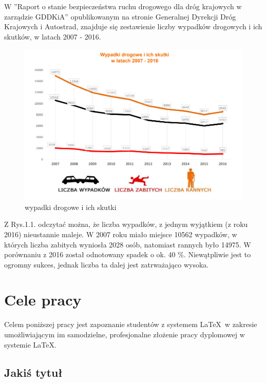 \newpage


W ''Raport o stanie bezpieczeństwa ruchu drogowego dla dróg krajowych w zarządzie GDDKiA'' opublikowanym na stronie Generalnej Dyrekcji Dróg Krajowych i Autostrad, znajduje się zestawienie liczby wypadków drogowych i ich skutków, w latach 2007 - 2016.

\begin{figure}[h]
\caption{wypadki drogowe i ich skutki}
\centering
\includegraphics[width=1\textwidth]{picture1}
\end{figure}

Z Rys.1.1. odczytać można, że liczba wypadków, z jednym wyjątkiem (z roku 2016) nieustannie maleje. W 2007 roku miało miejsce 10562 wypadków, w których liczba zabitych wyniosła 2028 osób, natomiast rannych było 14975. W porównaniu z 2016 został odnotowany spadek o ok. 40 \%. Niewątpliwie jest to ogromny sukces, jednak liczba ta dalej jest zatrważająco wysoka. 

\newpage
\section{Cele pracy}
\label{sec:celePracy}


Celem poniższej pracy jest zapoznanie studentów z systemem \LaTeX~w zakresie umożliwiającym im samodzielne, profesjonalne złożenie pracy dyplomowej w systemie \LaTeX.

\subsection{Jakiś tytuł}

